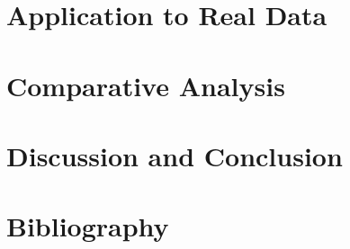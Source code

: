 \documentclass[12pt]{article}
\begin{document}
\section{Application to Real Data}


\section{Comparative Analysis}


\section{Discussion and Conclusion}


\section{Bibliography}
\end{document}
